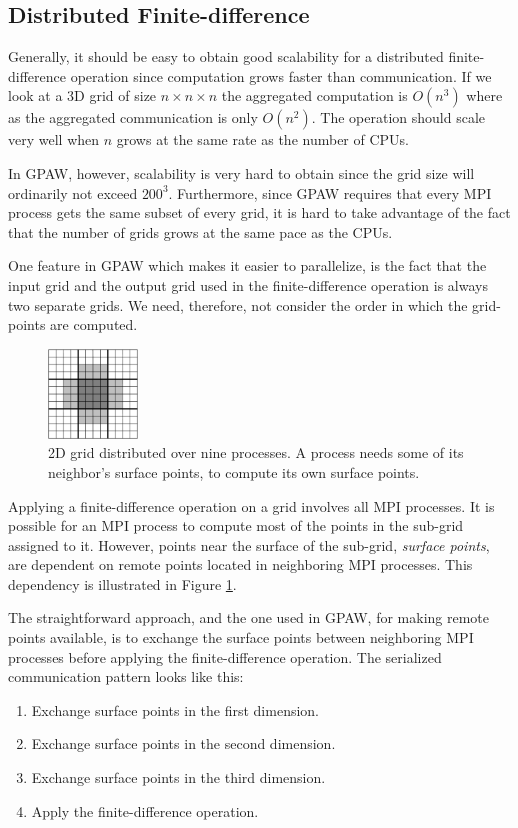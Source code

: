 \documentclass[conference]{IEEEtran}
\begin{document}
\subsection{Distributed Finite-difference}
Generally, it should be easy to obtain good scalability for a distributed finite-difference operation since computation grows faster than communication. If we look at a 3D grid of size $n \times n \times n$ the aggregated computation is $O\left(n^3\right)$ where as the aggregated communication is only $O\left(n^2\right)$. The operation should scale very well when $n$ grows at the same rate as the number of CPUs.

In GPAW, however, scalability is very hard to obtain since the grid size will ordinarily not exceed $200^3$. Furthermore, since GPAW requires that every MPI process gets the same subset of every grid, it is hard to take advantage of the fact that the number of grids grows at the same pace as the CPUs.

One feature in GPAW which makes it easier to parallelize, is the fact that the input grid and the output grid used in the finite-difference operation is always two separate grids. We need, therefore, not consider the order in which the grid-points are computed.

\begin{figure}
 \centering
 \includegraphics[width=90px]{gfx/diststencil}
 \caption{2D grid distributed over nine processes. A process needs some of its neighbor's surface points, to compute its own surface points.}
 \label{fig:diststencil}
\end{figure}

Applying a finite-difference operation on a grid involves all MPI processes. It is possible for an MPI process to compute most of the points in the sub-grid assigned to it. However, points near the surface of the sub-grid, \emph{surface points}, are dependent on remote points located in neighboring MPI processes. This dependency is illustrated in Figure \ref{fig:diststencil}.

The straightforward approach, and the one used in GPAW, for making remote points available, is to exchange the surface points between neighboring MPI processes before applying the finite-difference operation. The serialized communication pattern looks like this:
\begin{enumerate}
 \item Exchange surface points in the first dimension.
 \item Exchange surface points in the second dimension.
 \item Exchange surface points in the third dimension.
 \item Apply the finite-difference operation.
\end{enumerate}
\end{document}
